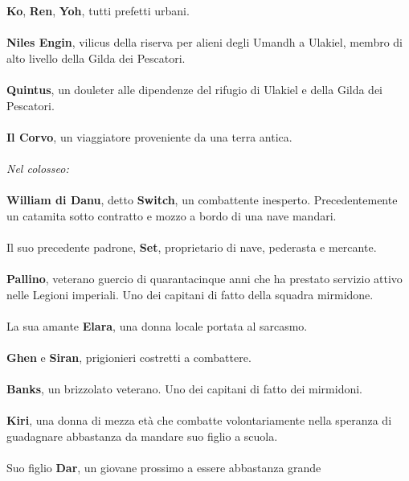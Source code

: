 \phantom{123}\textbf{Ko}, \textbf{Ren}, \textbf{Yoh}, tutti prefetti urbani.
\leavevmode\\
\leavevmode\\
\phantom{123}\textbf{Niles Engin}, vilicus della riserva per alieni degli Umandh a
Ulakiel, membro di alto livello della Gilda dei Pescatori.
\leavevmode\\
\leavevmode\\
\phantom{123}\textbf{Quintus}, un douleter alle dipendenze del rifugio di Ulakiel e
della Gilda dei Pescatori.
\leavevmode\\
\leavevmode\\
\phantom{123}\textbf{Il Corvo}, un viaggiatore proveniente da una terra antica.
\leavevmode\\
\leavevmode\\
\textit{Nel colosseo:}
\leavevmode\\
\leavevmode\\
\phantom{123}\textbf{William di Danu}, detto \textbf{Switch}, un combattente
inesperto. Precedentemente un catamita sotto contratto e mozzo a bordo
di una nave mandari.
\leavevmode\\
\leavevmode\\
\phantom{123}Il suo precedente padrone, \textbf{Set}, proprietario di nave, pederasta
e mercante.
\leavevmode\\
\leavevmode\\
\phantom{123}\textbf{Pallino}, veterano guercio di quarantacinque anni che ha
prestato servizio attivo nelle Legioni imperiali. Uno dei capitani di
fatto della squadra mirmidone.
\leavevmode\\
\leavevmode\\
\phantom{123}La sua amante \textbf{Elara}, una donna locale portata al sarcasmo.
\leavevmode\\
\leavevmode\\
\phantom{123}\textbf{Ghen} e \textbf{Siran}, prigionieri costretti a combattere.
\leavevmode\\
\leavevmode\\
\phantom{123}\textbf{Banks}, un brizzolato veterano. Uno dei capitani di fatto dei
mirmidoni.
\leavevmode\\
\leavevmode\\
\phantom{123}\textbf{Kiri}, una donna di mezza età che combatte volontariamente nella
speranza di guadagnare abbastanza da mandare suo figlio a scuola.
\leavevmode\\
\leavevmode\\
\phantom{123}Suo figlio \textbf{Dar}, un giovane prossimo a essere abbastanza grande

